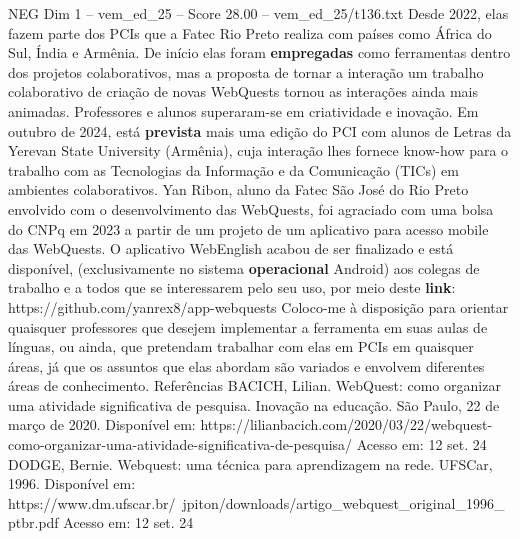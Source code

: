 \begin{textsample}{NEG Dim 1 – vem\_ed\_25 – Score 28.00 – vem\_ed\_25/t136.txt}
Desde 2022, elas fazem parte dos PCIs que a Fatec Rio Preto realiza com países como África do Sul, Índia e Armênia.
De início elas foram \textbf{empregadas} como ferramentas dentro dos projetos colaborativos, mas a proposta de tornar a interação um trabalho colaborativo de criação de novas WebQuests tornou as interações ainda mais animadas.
Professores e alunos superaram-se em criatividade e inovação.
Em outubro de 2024, está \textbf{prevista} mais uma edição do PCI com alunos de Letras da Yerevan State University (Armênia), cuja interação lhes fornece know-how para o trabalho com as Tecnologias da Informação e da Comunicação (TICs) em ambientes colaborativos.
Yan Ribon, aluno da Fatec São José do Rio Preto envolvido com o desenvolvimento das WebQuests, foi agraciado com uma bolsa do CNPq em 2023 a partir de um projeto de um aplicativo para acesso mobile das WebQuests.
O aplicativo WebEnglish acabou de ser finalizado e está disponível, (exclusivamente no sistema \textbf{operacional} Android) aos colegas de trabalho e a todos que se interessarem pelo seu uso, por meio deste \textbf{link}: https://github.com/yanrex8/app-webquests Coloco-me à disposição para orientar quaisquer professores que desejem implementar a ferramenta em suas aulas de línguas, ou ainda, que pretendam trabalhar com elas em PCIs em quaisquer áreas, já que os assuntos que elas abordam são variados e envolvem diferentes áreas de conhecimento.
Referências BACICH, Lilian.
WebQuest: como organizar uma atividade significativa de pesquisa.
Inovação na educação.
São Paulo, 22 de março de 2020.
Disponível em: https://lilianbacich.com/2020/03/22/webquest-como-organizar-uma-atividade-significativa-de-pesquisa/ Acesso em: 12 set. 24 DODGE, Bernie.
Webquest: uma técnica para aprendizagem na rede.
UFSCar, 1996.
Disponível em: https://www.dm.ufscar.br/~jpiton/downloads/artigo\_webquest\_original\_1996\_ptbr.pdf Acesso em: 12 set. 24

\end{textsample}
